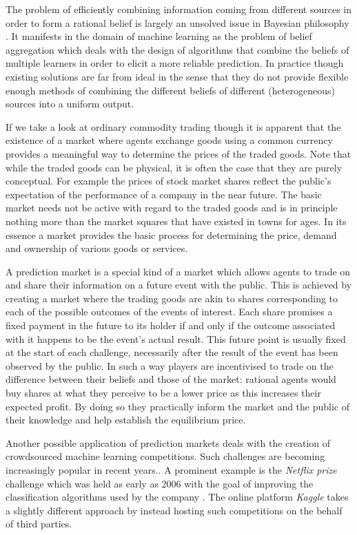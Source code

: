 \documentclass[bsc,frontabs,twoside,singlespacing,parskip,deptreport]{infthesis}     %
\begin{document}
The problem of efficiently combining information coming from different sources in order to form a rational belief is largely an unsolved issue in Bayesian philosophy \cite{greene_collective_2010}. It manifests in the domain of machine learning as the problem of belief aggregation which deals with the design of algorithms that combine the beliefs of multiple learners in order to elicit a more reliable prediction. In practice though existing solutions are far from ideal in the sense that they do not provide flexible enough methods of combining the different beliefs of different (heterogeneous) sources into a uniform output. 

    If we take a look at ordinary commodity trading though it is apparent that the existence of a market where agents exchange goods using a common currency provides a meaningful way to determine the prices of the traded goods. Note that while the traded goods can be physical, it is often the case that they are purely conceptual. For example the prices of stock market shares reflect the public's expectation of the performance of a company in the near future. The basic market needs not be active with regard to the traded goods and is in principle nothing more than the market squares that have existed in towns for ages. In its essence a market provides the basic process for determining the price, demand and ownership of various goods or services.

    A prediction market is a special kind of a market which allows agents to trade on and share their information on a future event with the public. This is achieved by creating a market where the trading goods are akin to shares corresponding to each of the possible outcomes of the events of interest. Each share promises a fixed payment in the future to its holder if and only if the outcome associated with it happens to be the event's actual result. This future point is usually fixed at the start of each challenge, necessarily after the result of the event has been observed by the public. In such a way players are incentivised to trade on the difference between their beliefs and those of the market: rational agents would buy shares at what they perceive to be a lower price as this increases their expected profit. By doing so they practically inform the market and the public of their knowledge and help establish the equilibrium price.

    Another possible application of prediction markets deals with the creation of crowdsourced machine learning competitions. Such challenges are becoming increasingly popular in recent years.. A prominent example is the {\em Netflix prize} challenge which was held as early as 2006 with the goal of improving the classification algorithms used by the company \cite{bennett_netflix_2007}. The online platform {\em Kaggle} takes a slightly different approach by instead hosting such competitions on the behalf of third parties. 
    
\end{document}
